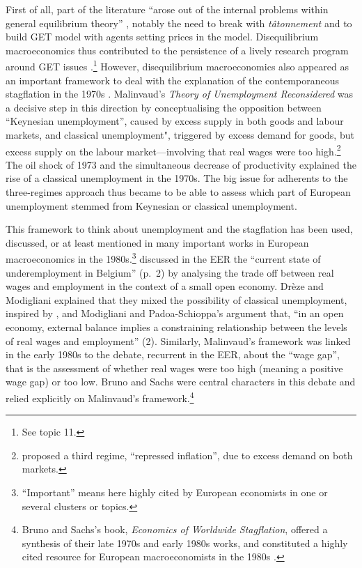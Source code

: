 \documentclass[]{elsarticle} %
\begin{document}
First of all, part of the literature ``arose out of the internal
problems within general equilibrium theory''
\citep[105]{backhouseboianovski2013}, notably the need to break with
\emph{tâtonnement} and to build GET model with agents setting prices in
the model. Disequilibrium macroeconomics thus contributed to the
persistence of a lively research program around GET issues .\footnote{See
  topic 11.} However, disequilibrium macroeconomics also appeared as an
important framework to deal with the explanation of the contemporaneous
stagflation in the 1970s \citep[chapter 8]{backhouseboianovski2013}.
Malinvaud's \emph{Theory of Unemployment Reconsidered}
\citeyearpar{malinvaud1977} was a decisive step in this direction by
conceptualising the opposition between ``Keynesian unemployment'',
caused by excess supply in both goods and labour markets, and classical
unemployment", triggered by excess demand for goods, but excess supply
on the labour market---involving that real wages were too
high.\footnote{\citet{malinvaud1977} proposed a third regime,
  ``repressed inflation'', due to excess demand on both markets.} The
oil shock of 1973 and the simultaneous decrease of productivity
explained the rise of a classical unemployment in the 1970s. The big
issue for adherents to the three-regimes approach thus became to be able
to assess which part of European unemployment stemmed from Keynesian or
classical unemployment.

This framework to think about unemployment and the stagflation has been
used, discussed, or at least mentioned in many important works in
European macroeconomics in the 1980s.\footnote{``Important'' means here
  highly cited by European economists in one or several clusters or
  topics.} \citet{dreze1981} discussed in the EER the ``current state of
underemployment in Belgium'' (p.~2) by analysing the trade off between
real wages and employment in the context of a small open economy. Drèze
and Modigliani explained that they mixed the possibility of classical
unemployment, inspired by \citet{malinvaud1977}, and Modigliani and
Padoa-Schioppa's argument that, ``in an open economy, external balance
implies a constraining relationship between the levels of real wages and
employment'' (2). Similarly, Malinvaud's framework was linked in the
early 1980s to the debate, recurrent in the EER, about the ``wage gap'',
that is the assessment of whether real wages were too high (meaning a
positive wage gap) or too low. Bruno and Sachs were central characters
in this debate and relied explicitly on Malinvaud's
framework.\footnote{Bruno and Sachs's \citeyearpar{brunosachs1985} book,
  \emph{Economics of Worldwide Stagflation}, offered a synthesis of
  their late 1970s and early 1980s works, and constituted a highly cited
  resource for European macroeconomists in the 1980s \citep[see
  also][section 3]{goutsmedt2021}.}
\end{document}
